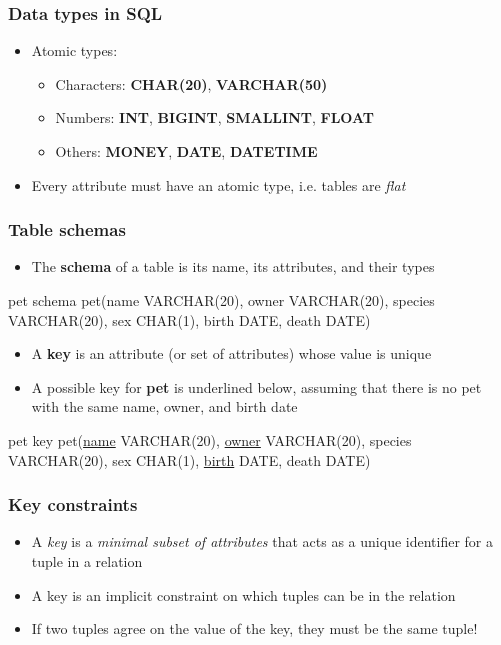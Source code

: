 \documentclass[hyperref={pdfpagelabels=false},svgnames,xcolor=table]{beamer}
\begin{document}
\begin{frame}
  \frametitle{Data types in SQL}
  \begin{itemize}
    \item Atomic types:
      \begin{itemize}
        \item Characters: \textbf{CHAR(20)}, \textbf{VARCHAR(50)}
        \item Numbers: \textbf{INT}, \textbf{BIGINT}, \textbf{SMALLINT},
          \textbf{FLOAT}
        \item Others: \textbf{MONEY}, \textbf{DATE}, \textbf{DATETIME}
      \end{itemize}
    \item Every attribute must have an atomic type, i.e. tables are \emph{flat}
  \end{itemize}
\end{frame}

\begin{frame}
  \frametitle{Table schemas}
  \begin{itemize}
    \item The \textbf{schema} of a table is its name, its attributes, and
      their types
  \end{itemize}
  \begin{block}{pet schema}
    pet(name VARCHAR(20), owner VARCHAR(20), species VARCHAR(20), sex CHAR(1),
        birth DATE, death DATE)
  \end{block}
  \begin{itemize}
    \item A \textbf{key} is an attribute (or set of attributes) whose value
      is unique
    \item A possible key for \textbf{pet} is underlined below, assuming that
      there is no pet with the same name, owner, and birth date 
  \end{itemize}
  \begin{block}{pet key}
    pet(\underline{name} VARCHAR(20), \underline{owner} VARCHAR(20), species VARCHAR(20), sex CHAR(1),
        \underline{birth} DATE, death DATE)
  \end{block}
\end{frame}

\begin{frame}
  \frametitle{Key constraints}
  \begin{itemize}
    \item A \emph{key} is a \emph{minimal subset of attributes} that
      acts as a unique identifier for a tuple in a relation
    \item A key is an implicit constraint on which tuples can be in the 
      relation 
    \item If two tuples agree on the value of the key, they must be the
      same tuple!
  \end{itemize}
\end{frame}
\end{document}
